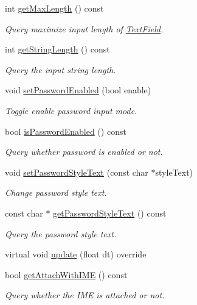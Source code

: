 \begin{DoxyCompactItemize}
int \hyperlink{classui_1_1TextField_a21ae7052464727df77737475ebe4cf34}{get\+Max\+Length} () const
\begin{DoxyCompactList}\small\item\em Query maximize input length of \hyperlink{classui_1_1TextField}{Text\+Field}. \end{DoxyCompactList}\item 
int \hyperlink{classui_1_1TextField_a5c3bc7fe189d790d4e209527dbeba2ab}{get\+String\+Length} () const
\begin{DoxyCompactList}\small\item\em Query the input string length. \end{DoxyCompactList}\item 
void \hyperlink{classui_1_1TextField_a9d20b87cd9307d0e5bcf5fa5c86d1c19}{set\+Password\+Enabled} (bool enable)
\begin{DoxyCompactList}\small\item\em Toggle enable password input mode. \end{DoxyCompactList}\item 
bool \hyperlink{classui_1_1TextField_afc35114b2c350de28a400baeb2c56b8f}{is\+Password\+Enabled} () const
\begin{DoxyCompactList}\small\item\em Query whether password is enabled or not. \end{DoxyCompactList}\item 
void \hyperlink{classui_1_1TextField_a787ba67bbd76be259b96b0a44407038a}{set\+Password\+Style\+Text} (const char $\ast$style\+Text)
\begin{DoxyCompactList}\small\item\em Change password style text. \end{DoxyCompactList}\item 
const char $\ast$ \hyperlink{classui_1_1TextField_aed4a24fd558b1592c22899ae89d2ef34}{get\+Password\+Style\+Text} () const
\begin{DoxyCompactList}\small\item\em Query the password style text. \end{DoxyCompactList}\item 
virtual void \hyperlink{classui_1_1TextField_a7684f9503909dfc66085922bd52ec449}{update} (float dt) override
\item 
bool \hyperlink{classui_1_1TextField_ac71f515312d2201aaa5db7ecff2f3fc4}{get\+Attach\+With\+I\+ME} () const
\begin{DoxyCompactList}\small\item\em Query whether the I\+ME is attached or not. \end{DoxyCompactList}\item 

\end{DoxyCompactItemize}
